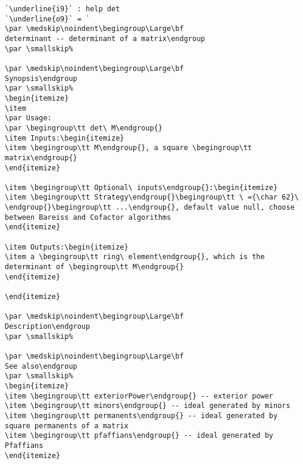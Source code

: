 \documentclass[12pt,a4paper]{amsart}
\begin{document}
\begin{lstlisting}[language=Macaulay2]
`\underline{i9}` : help det
`\underline{o9}` = `
\par \medskip\noindent\begingroup\Large\bf
determinant -- determinant of a matrix\endgroup
\par \smallskip%

\par \medskip\noindent\begingroup\Large\bf
Synopsis\endgroup
\par \smallskip%
\begin{itemize}
\item 
\par Usage: 
\par \begingroup\tt det\ M\endgroup{}
\item Inputs:\begin{itemize}
\item \begingroup\tt M\endgroup{}, a square \begingroup\tt matrix\endgroup{}
\end{itemize}

\item \begingroup\tt Optional\ inputs\endgroup{}:\begin{itemize}
\item \begingroup\tt Strategy\endgroup{}\begingroup\tt \ ={\char 62}\ \endgroup{}\begingroup\tt ...\endgroup{}, default value null, choose between Bareiss and Cofactor algorithms
\end{itemize}

\item Outputs:\begin{itemize}
\item a \begingroup\tt ring\ element\endgroup{}, which is the determinant of \begingroup\tt M\endgroup{}
\end{itemize}

\end{itemize}

\par \medskip\noindent\begingroup\Large\bf
Description\endgroup
\par \smallskip%

\par \medskip\noindent\begingroup\Large\bf
See also\endgroup
\par \smallskip%
\begin{itemize}
\item \begingroup\tt exteriorPower\endgroup{} -- exterior power
\item \begingroup\tt minors\endgroup{} -- ideal generated by minors
\item \begingroup\tt permanents\endgroup{} -- ideal generated by square permanents of a matrix
\item \begingroup\tt pfaffians\endgroup{} -- ideal generated by Pfaffians
\end{itemize}


\end{lstlisting}
\end{document}
